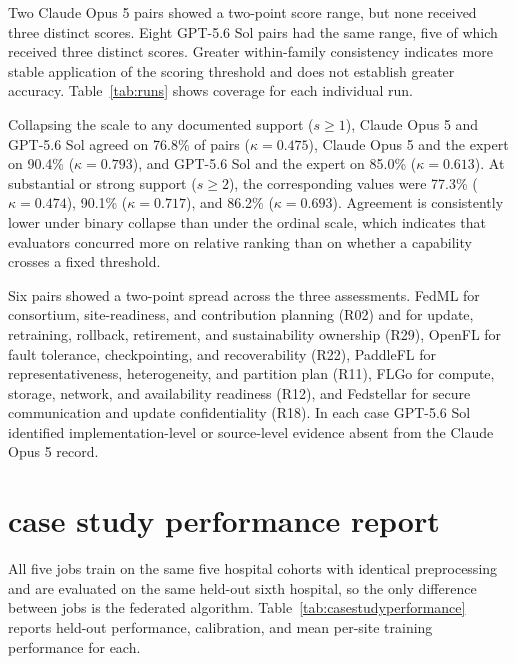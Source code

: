 

Two Claude Opus 5 pairs showed a two-point score range, but none received three distinct scores. Eight GPT-5.6 Sol pairs had the same range, five of which received three distinct scores. 
Greater within-family consistency indicates more stable application of the scoring threshold and does not establish greater accuracy.
%
Table~\ref{tab:runs} shows coverage for each individual run. 



Collapsing the scale to any documented support ($s \geq 1$), Claude Opus 5 and GPT-5.6 Sol agreed on 76.8\% of pairs ($\kappa = 0.475$), Claude Opus 5 and the expert on 90.4\% ($\kappa = 0.793$), and GPT-5.6 Sol and the expert on 85.0\% ($\kappa = 0.613$). At substantial or strong support ($s \geq 2$), the corresponding values were 77.3\% ($\kappa = 0.474$), 90.1\% ($\kappa = 0.717$), and 86.2\% ($\kappa = 0.693$). Agreement is consistently lower under binary collapse than under the ordinal scale, which indicates that evaluators concurred more on relative ranking than on whether a capability crosses a fixed threshold.

Six pairs showed a two-point spread across the three assessments. FedML for
consortium, site-readiness, and contribution planning (R02) and for update,
retraining, rollback, retirement, and sustainability ownership (R29), OpenFL
for fault tolerance, checkpointing, and recoverability (R22), PaddleFL for
representativeness, heterogeneity, and partition plan (R11), FLGo for
compute, storage, network, and availability readiness (R12), and Fedstellar
for secure communication and update confidentiality (R18). In each case
GPT-5.6 Sol identified implementation-level or source-level evidence absent
from the Claude Opus 5 record.


\section{case study performance report}
\label{app:case_study}

All five jobs train on the same five hospital cohorts with identical preprocessing and
are evaluated on the same held-out sixth hospital, so the only difference between jobs
is the federated algorithm. Table~\ref{tab:casestudyperformance} reports held-out
performance, calibration, and mean per-site training performance for each.


